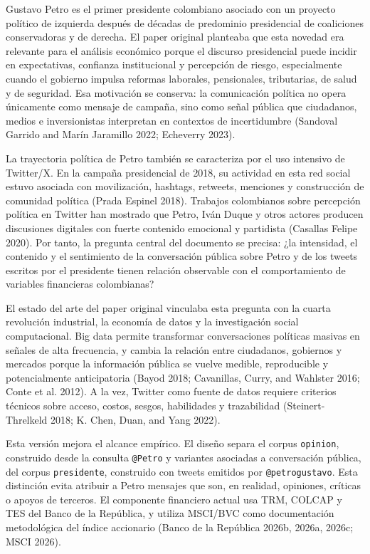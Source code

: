 \documentclass[
]{interact}
\begin{document}
Gustavo Petro es el primer presidente colombiano asociado con un
proyecto político de izquierda después de décadas de predominio
presidencial de coaliciones conservadoras y de derecha. El paper
original planteaba que esta novedad era relevante para el análisis
económico porque el discurso presidencial puede incidir en expectativas,
confianza institucional y percepción de riesgo, especialmente cuando el
gobierno impulsa reformas laborales, pensionales, tributarias, de salud
y de seguridad. Esa motivación se conserva: la comunicación política no
opera únicamente como mensaje de campaña, sino como señal pública que
ciudadanos, medios e inversionistas interpretan en contextos de
incertidumbre (Sandoval Garrido and Marín Jaramillo 2022; Echeverry
2023).

La trayectoria política de Petro también se caracteriza por el uso
intensivo de Twitter/X. En la campaña presidencial de 2018, su actividad
en esta red social estuvo asociada con movilización, hashtags, retweets,
menciones y construcción de comunidad política (Prada Espinel 2018).
Trabajos colombianos sobre percepción política en Twitter han mostrado
que Petro, Iván Duque y otros actores producen discusiones digitales con
fuerte contenido emocional y partidista (Casallas Felipe 2020). Por
tanto, la pregunta central del documento se precisa: ¿la intensidad, el
contenido y el sentimiento de la conversación pública sobre Petro y de
los tweets escritos por el presidente tienen relación observable con el
comportamiento de variables financieras colombianas?

El estado del arte del paper original vinculaba esta pregunta con la
cuarta revolución industrial, la economía de datos y la investigación
social computacional. Big data permite transformar conversaciones
políticas masivas en señales de alta frecuencia, y cambia la relación
entre ciudadanos, gobiernos y mercados porque la información pública se
vuelve medible, reproducible y potencialmente anticipatoria (Bayod 2018;
Cavanillas, Curry, and Wahlster 2016; Conte et al. 2012). A la vez,
Twitter como fuente de datos requiere criterios técnicos sobre acceso,
costos, sesgos, habilidades y trazabilidad (Steinert-Threlkeld 2018; K.
Chen, Duan, and Yang 2022).

Esta versión mejora el alcance empírico. El diseño separa el corpus
\texttt{opinion}, construido desde la consulta \texttt{@Petro} y
variantes asociadas a conversación pública, del corpus
\texttt{presidente}, construido con tweets emitidos por
\texttt{@petrogustavo}. Esta distinción evita atribuir a Petro mensajes
que son, en realidad, opiniones, críticas o apoyos de terceros. El
componente financiero actual usa TRM, COLCAP y TES del Banco de la
República, y utiliza MSCI/BVC como documentación metodológica del índice
accionario (Banco de la República 2026b, 2026a, 2026c; MSCI 2026).
\end{document}
